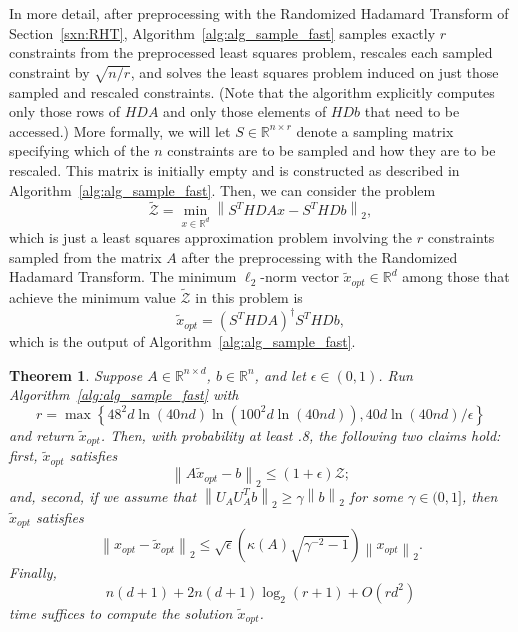 \documentclass[11pt]{article}
\newcommand{\VTTNorm }[1]{\mbox{}\left\|#1\right\|_2  }
\newtheorem{theorem}{Theorem}
\begin{document}
In more detail, after preprocessing with the Randomized Hadamard Transform of Section~\ref{sxn:RHT}, Algorithm~\ref{alg:alg_sample_fast} samples exactly $r$ constraints from the preprocessed least squares problem, rescales each sampled constraint by $\sqrt{n/r}$, and solves the least squares problem induced on just those sampled and rescaled constraints. (Note that the algorithm explicitly computes only those rows of $HDA$ and only those elements of $HDb$ that need to be accessed.) More formally, we will let $S \in \mathbb{R}^{n \times r}$ denote a sampling matrix specifying which of the $n$ constraints are to be sampled and how they are to be rescaled. This matrix is initially empty and is constructed as described in Algorithm~\ref{alg:alg_sample_fast}. Then, we can consider the problem
\begin{equation*}
\tilde{\mathcal{Z}}
   = \min_{x \in \mathbb{R}^d} \VTTNorm{S^THDAx- S^THDb } ,
\end{equation*}
which is just a least squares approximation problem involving the $r$ constraints sampled from the matrix $A$ after the preprocessing with the Randomized Hadamard Transform. The minimum $\ell_2$-norm vector $\tilde{x}_{opt} \in \mathbb{R}^d$ among those that achieve the minimum value $\tilde{\mathcal{Z}}$ in this problem is
\begin{equation*}
\tilde{x}_{opt}
   = \left(S^THDA\right)^{\dagger}S^THDb     ,
\end{equation*}
which is the output of Algorithm~\ref{alg:alg_sample_fast}.
\begin{theorem}
\label{thm:alg_sample_fast}
Suppose $A \in \mathbb{R}^{n \times d}$, $b \in \mathbb{R}^{n}$, and let $\epsilon \in (0,1)$. Run Algorithm~\ref{alg:alg_sample_fast} with
\begin{equation}\label{eqn:rvaluefinal}
r = \max\left\{48^2 d \ln\left(40nd\right)\ln\left(100^2d \ln \left(40nd\right)\right),
40d\ln(40nd)/\epsilon\right\}
\end{equation}
and return $\tilde{x}_{opt}$. Then, with probability at least .8, the following two claims hold: first, $\tilde{x}_{opt}$ satisfies
$$
\VTTNorm{A\tilde{x}_{opt}-b} \le (1+\epsilon) \mathcal{Z};
$$
and, second, if we assume that $\VTTNorm{U_A U_A^T b} \ge \gamma \VTTNorm{b}$ for some $\gamma \in (0,1]$, then $\tilde{x}_{opt}$ satisfies
$$
\VTTNorm{x_{opt}-\tilde{x}_{opt}}
  \leq \sqrt{\epsilon}\left(\kappa(A)\sqrt{\gamma^{-2}-1}\right)\VTTNorm{x_{opt}}.
$$
Finally,
$$ n(d+1) + 2n(d+1) \log_2 \left(r + 1\right) + O\left(rd^2 \right)$$
time suffices to compute the solution $\tilde{x}_{opt}$.
\end{theorem}
\end{document}
